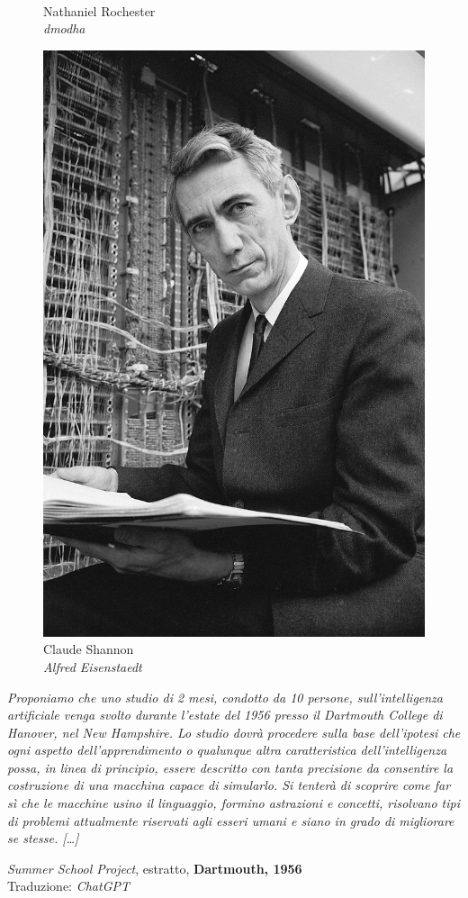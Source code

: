 \begin{frame}[t,fragile]
{\begin{minipage}[t]{.4\textwidth}
\begin{minipage}[t]{0.45\textwidth}
\begin{figure}[ht]
				{\tiny\\Nathaniel Rochester\\\vspace*{-1pt}\textit{\textcopyright dmodha}}
			\end{figure}
		\end{minipage}
		\hfill
		\begin{minipage}[t]{0.45\textwidth}
			\centering
			\begin{figure}[ht]
				\includegraphics[width=.6\textwidth]{img/Roberts-Claude-Shannon.png}
				{\tiny\\Claude Shannon\\\vspace*{-1pt}\textit{\textcopyright Alfred Eisenstaedt}}
			\end{figure}
		\end{minipage}
	\end{minipage}
	\hfill
	\begin{minipage}[t]{.55\textwidth}
		\renewcommand{\epigraphsize}{\scriptsize}
		\setlength{\afterepigraphskip}{0pt}
		\setlength{\beforeepigraphskip}{10pt}
		\setlength{\epigraphwidth}{\textwidth}
		\epigraph{\textit{Proponiamo che uno studio di 2 mesi, condotto da 10 persone, sull'\alert{intelligenza artificiale} venga svolto durante l'estate del 1956 presso il Dartmouth College di Hanover, nel New Hampshire. Lo studio dovrà procedere sulla base dell'ipotesi che ogni aspetto dell'apprendimento o qualunque altra caratteristica dell'intelligenza possa, in linea di principio, essere descritto con tanta precisione da consentire la costruzione di una macchina capace di simularlo. Si tenterà di scoprire come far sì che le macchine usino il linguaggio, formino astrazioni e concetti, risolvano tipi di problemi attualmente riservati agli esseri umani e siano in grado di migliorare se stesse. [\ldots]
}}{\textit{Summer School Project}, estratto, \textbf{Dartmouth, 1956}\\Traduzione: \textit{\textcopyright ChatGPT}}
	\end{minipage}%
	}
\end{frame}

